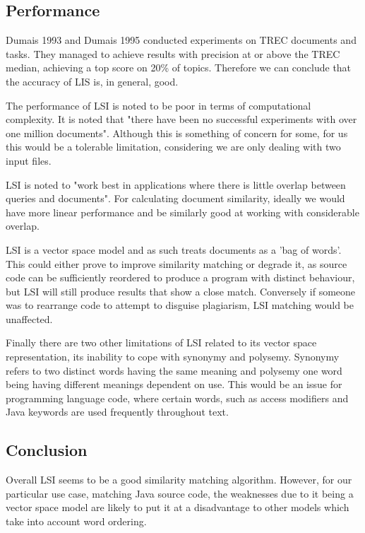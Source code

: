 
\subsection{Performance}
Dumais 1993 and Dumais 1995 conducted experiments on TREC documents and tasks. They managed to achieve results with precision at or above the TREC median, achieving a top score on 20\% of topics. Therefore we can conclude that the accuracy of LIS is, in general, good.

The performance of LSI is noted to be poor in terms of computational complexity. It is noted that "there have been no successful experiments with over one million documents". Although this is something of concern for some, for us this would be a tolerable limitation, considering we are only dealing with two input files.

LSI is noted to "work best in applications where there is little overlap between queries and documents". For calculating document similarity, ideally we would have more linear performance and be similarly good at working with considerable overlap.

LSI is a vector space model and as such treats documents as a 'bag of words'. This could either prove to improve similarity matching or degrade it, as source code can be sufficiently reordered to produce a program with distinct behaviour, but LSI will still produce results that show a close match. Conversely if someone was to rearrange code to attempt to disguise plagiarism, LSI matching would be unaffected.

Finally there are two other limitations of LSI related to its vector space representation, its inability to cope with synonymy and polysemy. Synonymy refers to two distinct words having the same meaning and polysemy one word being having different meanings dependent on use.  This would be an issue for programming language code, where certain words, such as access modifiers and Java keywords are used frequently throughout text. 

\subsection{Conclusion}
Overall LSI seems to be a good similarity matching algorithm. However, for our particular use case, matching Java source code, the weaknesses due to it being a vector space model are likely to put it at a disadvantage to other models which take into account word ordering.

\break